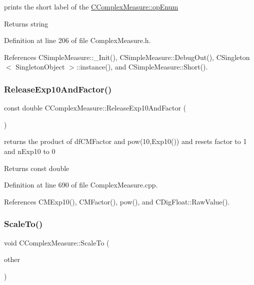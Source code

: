 prints the short label of the \hyperlink{classCComplexMeasure_ae22369976a7e5570add11a4172dcf062}{C\+Complex\+Measure\+::op\+Enum} 

\begin{DoxyReturn}{Returns}
string 
\end{DoxyReturn}


Definition at line 206 of file Complex\+Measure.\+h.



References C\+Simple\+Measure\+::\+\_\+\+Init(), C\+Simple\+Measure\+::\+Debug\+Out(), C\+Singleton$<$ Singleton\+Object $>$\+::instance(), and C\+Simple\+Measure\+::\+Short().

\mbox{\label{classCComplexMeasure_a2c4086ab6b664259b820f554f647cdbd}} 
\subsubsection{\texorpdfstring{Release\+Exp10\+And\+Factor()}{ReleaseExp10AndFactor()}}
{\footnotesize\ttfamily const double C\+Complex\+Measure\+::\+Release\+Exp10\+And\+Factor (\begin{DoxyParamCaption}{ }\end{DoxyParamCaption})\hspace{0.3cm}{\ttfamily [protected]}}



returns the product of df\+C\+M\+Factor and pow(10,\+Exp10()) and resets factor to 1 and n\+Exp10 to 0 

\begin{DoxyReturn}{Returns}
const double 
\end{DoxyReturn}


Definition at line 690 of file Complex\+Measure.\+cpp.



References C\+M\+Exp10(), C\+M\+Factor(), pow(), and C\+Dig\+Float\+::\+Raw\+Value().

\mbox{\label{classCComplexMeasure_a999dd5e5bb71a6bc548f959879b4e12f}} 
\subsubsection{\texorpdfstring{Scale\+To()}{ScaleTo()}}
{\footnotesize\ttfamily void C\+Complex\+Measure\+::\+Scale\+To (\begin{DoxyParamCaption}\item[{const \hyperlink{classCComplexMeasure}{C\+Complex\+Measure} \&}]{other }\end{DoxyParamCaption})}



